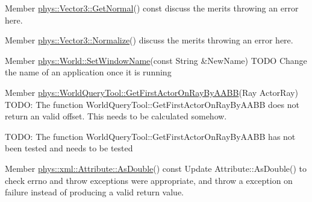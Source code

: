 \label{dd/da0/todo__todo000032}
\hypertarget{dd/da0/todo__todo000032}{}
 
\begin{DoxyDescription}
\item[Member \hyperlink{classphys_1_1Vector3_a81e11f45378758391c97ec55b519951c}{phys::Vector3::GetNormal}() const  ]discuss the merits throwing an error here. 
\end{DoxyDescription}

\label{dd/da0/todo__todo000031}
\hypertarget{dd/da0/todo__todo000031}{}
 
\begin{DoxyDescription}
\item[Member \hyperlink{classphys_1_1Vector3_ae39fe0545df88148bcd668b3bd2a4388}{phys::Vector3::Normalize}() ]discuss the merits throwing an error here. 
\end{DoxyDescription}

\label{dd/da0/todo__todo000034}
\hypertarget{dd/da0/todo__todo000034}{}
 
\begin{DoxyDescription}
\item[Member \hyperlink{classphys_1_1World_acd0dff342c08fe3008226488b7c53d97}{phys::World::SetWindowName}(const String \&NewName) ]TODO Change the name of an application once it is running 
\end{DoxyDescription}

\label{dd/da0/todo__todo000035}
\hypertarget{dd/da0/todo__todo000035}{}
 
\begin{DoxyDescription}
\item[Member \hyperlink{classphys_1_1WorldQueryTool_a67575416c2e9c652bbd873649ee38baf}{phys::WorldQueryTool::GetFirstActorOnRayByAABB}(Ray ActorRay) ]TODO: The function WorldQueryTool::GetFirstActorOnRayByAABB does not return an valid offset. This needs to be calculated somehow. 

TODO: The function WorldQueryTool::GetFirstActorOnRayByAABB has not been tested and needs to be tested 
\end{DoxyDescription}

\label{dd/da0/todo__todo000046}
\hypertarget{dd/da0/todo__todo000046}{}
 
\begin{DoxyDescription}
\item[Member \hyperlink{classphys_1_1xml_1_1Attribute_a467ae167d5407ae3293a22b8873cb43a}{phys::xml::Attribute::AsDouble}() const  ]Update Attribute::AsDouble() to check errno and throw exceptions were appropriate, and throw a exception on failure instead of producing a valid return value. 
\end{DoxyDescription}


